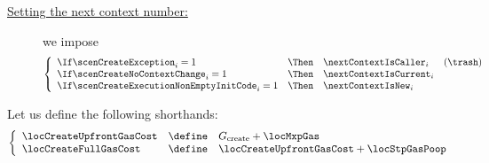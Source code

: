 \begin{description}
	\item[\underline{Setting the next context number:}]
		we impose
		\[
			\left\{ \begin{array}{lclr}
				\If \scenCreateException                     _{i} = 1  & \Then & \nextContextIsCaller   _{i} & (\trash) \\
				\If \scenCreateNoContextChange               _{i} = 1  & \Then & \nextContextIsCurrent  _{i} \\
				\If \scenCreateExecutionNonEmptyInitCode     _{i} = 1  & \Then & \nextContextIsNew      _{i} \\
			\end{array} \right.
		\]
\end{description}
Let us define the following shorthands:
\[
	\left\{ \begin{array}{lcl}
		\locCreateUpfrontGasCost & \define & G_\text{create} + \locMxpGas              \\
		\locCreateFullGasCost    & \define & \locCreateUpfrontGasCost + \locStpGasPoop \\
	\end{array} \right.
\]
